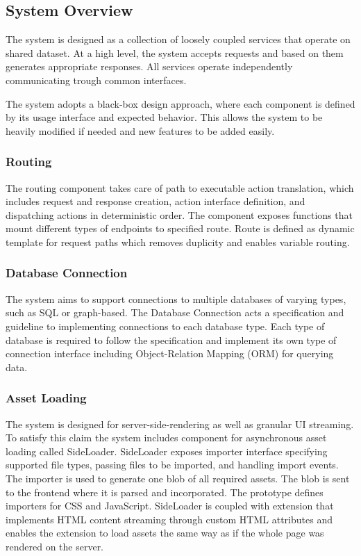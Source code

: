 \subsection{System Overview}\label{subsec:system-overview}
The system is designed as a collection of loosely coupled services that operate on shared dataset.
At a high level, the system accepts requests and based on them generates appropriate responses.
All services operate independently communicating trough common interfaces.

The system adopts a black-box design approach, where each component is defined by its usage interface and expected behavior.
This allows the system to be heavily modified if needed and new features to be added easily.

\subsubsection*{Routing}
The routing component takes care of path to executable action translation, which includes request and response creation,
action interface definition, and dispatching actions in deterministic order.
The component exposes functions that mount different types of endpoints to specified route.
Route is defined as dynamic template for request paths which removes duplicity and enables variable routing.

\subsubsection*{Database Connection}
The system aims to support connections to multiple databases of varying types, such as SQL or graph-based.
The Database Connection acts a specification and guideline to implementing connections to each database type.
Each type of database is required to follow the specification and implement its own type of connection interface including
Object-Relation Mapping (ORM) for querying data.

\subsubsection*{Asset Loading}
The system is designed for server-side-rendering as well as granular UI streaming.
To satisfy this claim the system includes component for asynchronous asset loading called SideLoader.
SideLoader exposes importer interface specifying supported file types, passing files to be imported,
and handling import events.
The importer is used to generate one blob of all required assets.
The blob is sent to the frontend where it is parsed and incorporated.
The prototype defines importers for CSS and JavaScript.
SideLoader is coupled with extension that implements HTML content streaming through custom HTML attributes and enables
the extension to load assets the same way as if the whole page was rendered on the server.

